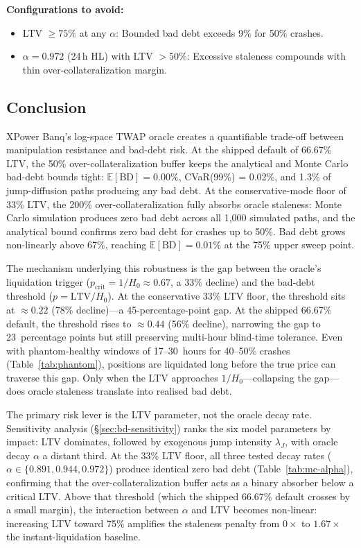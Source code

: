 \documentclass[10pt,a4paper,twocolumn]{article}
\begin{document}
\textbf{Configurations to avoid:}
\begin{itemize}[leftmargin=*]
\item LTV $\geq 75\%$ at any $\alpha$: Bounded bad debt exceeds 9\% for 50\% crashes.
\item $\alpha = 0.972$ (24\,h HL) with LTV $> 50\%$: Excessive staleness compounds with thin over-collateralization margin.
\end{itemize}

\subsection{Conclusion}
\label{sec:bd-conclusion}

XPower Banq's log-space TWAP oracle creates a quantifiable trade-off between manipulation resistance and bad-debt risk. At the shipped default of 66.67\% LTV, the 50\% over-collateralization buffer keeps the analytical and Monte Carlo bad-debt bounds tight: $\mathbb{E}[\text{BD}] = 0.00\%$, CVaR(99\%) = 0.02\%, and 1.3\% of jump-diffusion paths producing any bad debt. At the conservative-mode floor of 33\% LTV, the 200\% over-collateralization fully absorbs oracle staleness: Monte Carlo simulation produces zero bad debt across all 1{,}000 simulated paths, and the analytical bound confirms zero bad debt for crashes up to 50\%. Bad debt grows non-linearly above 67\%, reaching $\mathbb{E}[\text{BD}] = 0.01\%$ at the 75\% upper sweep point.

The mechanism underlying this robustness is the gap between the oracle's liquidation trigger ($p_{\text{crit}} = 1/H_0 \approx 0.67$, a 33\% decline) and the bad-debt threshold ($p = \text{LTV}/H_0$). At the conservative 33\% LTV floor, the threshold sits at $\approx 0.22$ (78\% decline)---a 45-percentage-point gap. At the shipped 66.67\% default, the threshold rises to $\approx 0.44$ (56\% decline), narrowing the gap to 23~percentage points but still preserving multi-hour blind-time tolerance. Even with phantom-healthy windows of 17--30~hours for 40--50\% crashes (Table~\ref{tab:phantom}), positions are liquidated long before the true price can traverse this gap. Only when the LTV approaches $1/H_0$---collapsing the gap---does oracle staleness translate into realised bad debt.

The primary risk lever is the LTV parameter, not the oracle decay rate. Sensitivity analysis (\S\ref{sec:bd-sensitivity}) ranks the six model parameters by impact: LTV dominates, followed by exogenous jump intensity $\lambda_J$, with oracle decay $\alpha$ a distant third. At the 33\% LTV floor, all three tested decay rates ($\alpha \in \{0.891, 0.944, 0.972\}$) produce identical zero bad debt (Table~\ref{tab:mc-alpha}), confirming that the over-collateralization buffer acts as a binary absorber below a critical LTV. Above that threshold (which the shipped 66.67\% default crosses by a small margin), the interaction between $\alpha$ and LTV becomes non-linear: increasing LTV toward 75\% amplifies the staleness penalty from $0\times$ to $1.67\times$ the instant-liquidation baseline.
\end{document}
